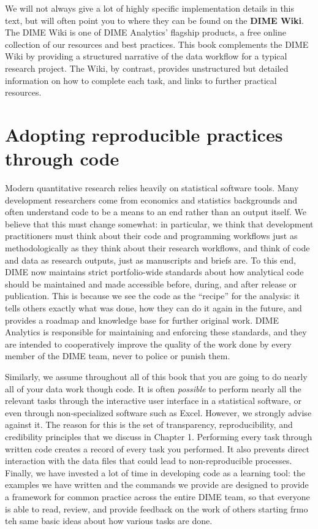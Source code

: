 We will not always give a lot of highly specific implementation details in this text,
but will often point you to where they can be found on the \textbf{DIME Wiki}.
The DIME Wiki is one of DIME Analytics' flagship products,
a free online collection of our resources and best practices.
This book complements the DIME Wiki by providing a structured narrative
of the data workflow for a typical research project.
The Wiki, by contrast, provides unstructured but detailed information
on how to complete each task, and links to further practical resources.

\section{Adopting reproducible practices through code}

Modern quantitative research relies heavily on statistical software tools.
Many development researchers come from economics and statistics backgrounds
and often understand code to be a means to an end rather than an output itself.
We believe that this must change somewhat:
in particular, we think that development practitioners
must think about their code and programming workflows
just as methodologically as they think about their research workflows,
and think of code and data as research outputs, just as manuscripts and briefs are.
To this end, DIME now maintains strict portfolio-wide standards
about how analytical code should be maintained and made accessible
before, during, and after release or publication.
This is because we see the code as the ``recipe'' for the analysis:
it tells others exactly what was done,
how they can do it again in the future,
and provides a roadmap and knowledge base for further original work.
DIME Analytics is responsible for maintaining and enforcing these standards,
and they are intended to cooperatively improve the quality of the work done by
every member of the DIME team, never to police or punish them.

Similarly, we assume throughout all of this book
that you are going to do nearly all of your data work though code.
It is often \textit{possible} to perform nearly all the relevant tasks
through the interactive user interface in a statistical software,
or even through non-specialized software such as Excel.
However, we strongly advise against it.
The reason for this is the set of
transparency, reproducibility, and credibility principles
that we discuss in Chapter 1.
Performing every task through written code
creates a record of every task you performed.
It also prevents direct interaction
with the data files that could lead to non-reproducible processes.
Finally, we have invested a lot of time in developing code as a learning tool:
the examples we have written and the commands we provide
are designed to provide a framework for common practice
across the entire DIME team, so that everyone is able to
read, review, and provide feedback on the work of others
starting frmo teh same basic ideas about how various tasks are done.

